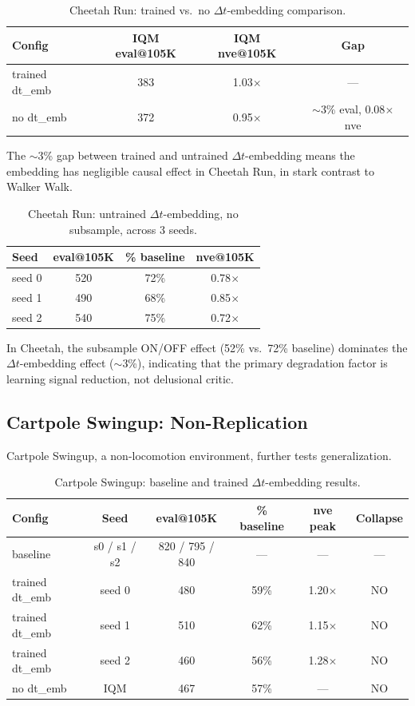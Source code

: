 \documentclass[10pt,letterpaper]{article}
\begin{document}
\begin{table}[h]
\centering
\caption{Cheetah Run: trained vs.\ no $\Delta t$-embedding comparison.}
\label{tab:cheetah-causal}
\begin{tabular}{lccc}
\toprule
Config & IQM eval@105K & IQM nve@105K & Gap \\
\midrule
trained dt\_emb & 383 & 1.03$\times$ & --- \\
no dt\_emb & 372 & 0.95$\times$ & $\sim$3\% eval, 0.08$\times$ nve \\
\bottomrule
\end{tabular}
\end{table}

The $\sim$3\% gap between trained and untrained $\Delta t$-embedding means the embedding has negligible causal effect in Cheetah Run, in stark contrast to Walker Walk.

\begin{table}[h]
\centering
\caption{Cheetah Run: untrained $\Delta t$-embedding, no subsample, across 3 seeds.}
\label{tab:cheetah-untrained}
\begin{tabular}{lccc}
\toprule
Seed & eval@105K & \% baseline & nve@105K \\
\midrule
seed 0 & 520 & 72\% & 0.78$\times$ \\
seed 1 & 490 & 68\% & 0.85$\times$ \\
seed 2 & 540 & 75\% & 0.72$\times$ \\
\bottomrule
\end{tabular}
\end{table}

In Cheetah, the subsample ON/OFF effect (52\% vs.\ 72\% baseline) dominates the $\Delta t$-embedding effect ($\sim$3\%), indicating that the primary degradation factor is learning signal reduction, not delusional critic.

\subsection{Cartpole Swingup: Non-Replication}
\label{sec:cartpole}

Cartpole Swingup, a non-locomotion environment, further tests generalization.

\begin{table}[h]
\centering
\caption{Cartpole Swingup: baseline and trained $\Delta t$-embedding results.}
\label{tab:cartpole}
\begin{tabular}{lccccc}
\toprule
Config & Seed & eval@105K & \% baseline & nve peak & Collapse \\
\midrule
baseline & s0 / s1 / s2 & 820 / 795 / 840 & --- & --- & --- \\
\midrule
trained dt\_emb & seed 0 & 480 & 59\% & 1.20$\times$ & NO \\
trained dt\_emb & seed 1 & 510 & 62\% & 1.15$\times$ & NO \\
trained dt\_emb & seed 2 & 460 & 56\% & 1.28$\times$ & NO \\
\midrule
no dt\_emb & IQM & 467 & 57\% & --- & NO \\
\bottomrule
\end{tabular}
\end{table}
\end{document}
